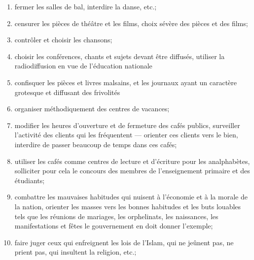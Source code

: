 \begin{enumerate}
\item
   
  fermer les salles de bal, interdire la danse, etc.;
   
\item
   
  censurer les pièces de théâtre et les films, choix sévère des pièces
  et des films;
   
\item
   
  contrôler et choisir les chansons;
   
\item
   
  choisir les conférences, chants et sujets devant être diffu­sés,
  utiliser la radiodiffusion en vue de l'éducation nationale
   
\item
   
  confisquer les pièces et livres malsains, et les journaux ayant un
  caractère grotesque et diffusant des frivolités
   
\item
   
  organiser méthodiquement des centres de vacances;
   
\item
   
  modifier les heures d'ouverture et de fermeture des cafés publics,
  surveiller l'activité des clients qui les fréquentent --- orienter ces
  clients vers le bien, interdire de passer beaucoup de temps dans ces
  cafés;
   
\item
   
  utiliser les cafés comme centres de lecture et d'écriture pour les
  analphabètes, solliciter pour cela le concours des mem­bres de
  l'enseignement primaire et des étudiants;
   
\item
   
  combattre les mauvaises habitudes qui nuisent à l'éco­nomie et à la
  morale de la nation, orienter les masses vers les bonnes habitudes et
  les buts louables tels que les réunions de mariages, les orphelinats,
  les naissances, les manifestations et fêtes le gouvernement en doit
  donner l'exemple;
   
\item
   
  faire juger ceux qui enfreignent les lois de l'Islam, qui ne jeûnent
  pas, ne prient pas, qui insultent la religion, etc.;
   

\end{enumerate}
